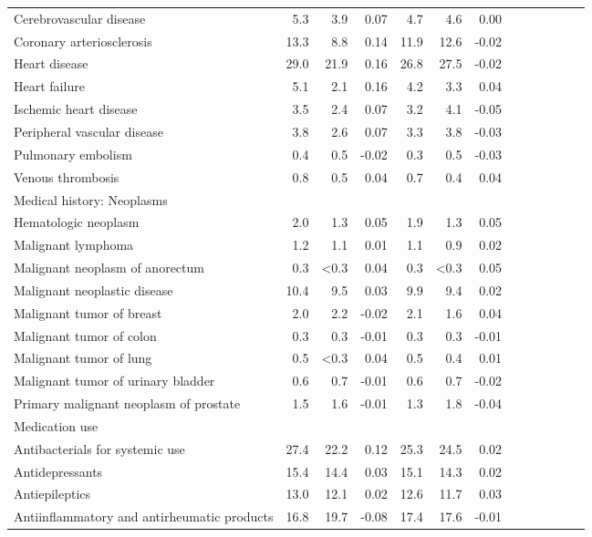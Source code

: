 \documentclass[11pt,]{article}
\begin{document}
\begin{longtable}{lrrrrrrrrrrrr}
      Cerebrovascular disease &  5.3 &  3.9 &  0.07 &  4.7 &  4.6 &  0.00 \\ 
      Coronary arteriosclerosis & 13.3 &  8.8 &  0.14 & 11.9 & 12.6 & -0.02 \\ 
      Heart disease & 29.0 & 21.9 &  0.16 & 26.8 & 27.5 & -0.02 \\ 
      Heart failure &  5.1 &  2.1 &  0.16 &  4.2 &  3.3 &  0.04 \\ 
      Ischemic heart disease &  3.5 &  2.4 &  0.07 &  3.2 &  4.1 & -0.05 \\ 
      Peripheral vascular disease &  3.8 &  2.6 &  0.07 &  3.3 &  3.8 & -0.03 \\ 
      Pulmonary embolism &  0.4 &  0.5 & -0.02 &  0.3 &  0.5 & -0.03 \\ 
      Venous thrombosis &  0.8 &  0.5 &  0.04 &  0.7 &  0.4 &  0.04 \\ 
  Medical history: Neoplasms &    &    &     &    &    &     \\ 
      Hematologic neoplasm &  2.0 &  1.3 &  0.05 &  1.9 &  1.3 &  0.05 \\ 
      Malignant lymphoma &  1.2 &  1.1 &  0.01 &  1.1 &  0.9 &  0.02 \\ 
      Malignant neoplasm of anorectum &  0.3 & <0.3 &  0.04 &  0.3 & <0.3 &  0.05 \\ 
      Malignant neoplastic disease & 10.4 &  9.5 &  0.03 &  9.9 &  9.4 &  0.02 \\ 
      Malignant tumor of breast &  2.0 &  2.2 & -0.02 &  2.1 &  1.6 &  0.04 \\ 
      Malignant tumor of colon &  0.3 &  0.3 & -0.01 &  0.3 &  0.3 & -0.01 \\ 
      Malignant tumor of lung &  0.5 & <0.3 &  0.04 &  0.5 &  0.4 &  0.01 \\ 
      Malignant tumor of urinary bladder &  0.6 &  0.7 & -0.01 &  0.6 &  0.7 & -0.02 \\ 
      Primary malignant neoplasm of prostate &  1.5 &  1.6 & -0.01 &  1.3 &  1.8 & -0.04 \\ 
  Medication use &    &    &     &    &    &     \\ 
      Antibacterials for systemic use & 27.4 & 22.2 &  0.12 & 25.3 & 24.5 &  0.02 \\ 
      Antidepressants & 15.4 & 14.4 &  0.03 & 15.1 & 14.3 &  0.02 \\ 
      Antiepileptics & 13.0 & 12.1 &  0.02 & 12.6 & 11.7 &  0.03 \\ 
      Antiinflammatory and antirheumatic products & 16.8 & 19.7 & -0.08 & 17.4 & 17.6 & -0.01 \\ 

\end{longtable}
\end{document}

